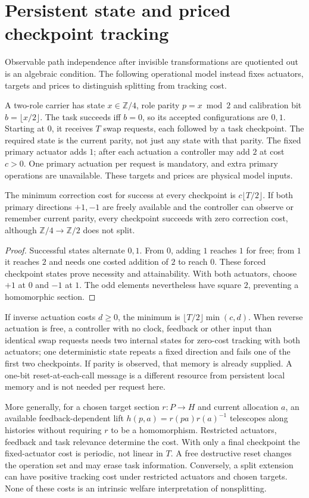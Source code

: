 \section{Persistent state and priced checkpoint tracking}\label{sec:05-state-1}
Observable path independence after invisible transformations are quotiented
out is an algebraic condition. The following operational model instead fixes
actuators, targets and prices to distinguish splitting from tracking cost.

A two-role carrier has state $x\in\mathbb Z/4$, role parity $p=x\bmod2$ and
calibration bit $b=\lfloor x/2\rfloor$. The task succeeds iff $b=0$, so its
accepted configurations are $0,1$. Starting at $0$, it receives $T$ swap
requests, each followed by a task checkpoint. The required state is the
current parity, not just any state with that parity. The fixed primary
actuator adds $1$; after each actuation a controller may add $2$ at cost $c>0$.
One primary actuation per request is mandatory, and extra primary operations
are unavailable. These targets and prices are physical model inputs.

\begin{proposition}\label{result:05-state-1}
The minimum correction cost for success at every checkpoint is
$c\lfloor T/2\rfloor$. If both primary directions $+1,-1$ are freely
available and the controller can observe or remember current parity, every
checkpoint succeeds with zero correction cost, although
$\mathbb Z/4\to\mathbb Z/2$ does not split.
\end{proposition}
\begin{proof}
Successful states alternate $0,1$. From $0$, adding $1$ reaches $1$ for free;
from $1$ it reaches $2$ and needs one costed addition of $2$ to reach $0$.
These forced checkpoint states prove necessity and attainability. With both
actuators, choose $+1$ at $0$ and $-1$ at $1$. The odd elements nevertheless
have square $2$, preventing a homomorphic section.
\end{proof}
If inverse actuation costs $d\ge0$, the minimum is
$\lfloor T/2\rfloor\min(c,d)$. When reverse actuation is free, a controller with no clock, feedback or other
input than identical swap requests needs two internal states for zero-cost
tracking with both actuators; one deterministic state repeats a fixed direction
and fails one of the first two checkpoints. If parity is observed, that memory
is already supplied. A one-bit reset-at-each-call message is a different
resource from persistent local memory and is not needed per request here.

More generally, for a chosen target section $r:P\to H$ and current allocation
$a$, an available feedback-dependent lift
$h(p,a)=r(pa)r(a)^{-1}$ telescopes along histories without requiring $r$ to be
a homomorphism. Restricted actuators, feedback and task relevance determine
the cost. With only a final checkpoint the fixed-actuator cost is periodic,
not linear in $T$. A free destructive reset changes the operation set and may
erase task information. Conversely, a split extension can have positive
tracking cost under restricted actuators and chosen targets. None of these
costs is an intrinsic welfare interpretation of nonsplitting.
